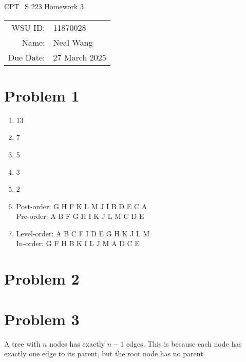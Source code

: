 \documentclass[12pt]{article}
\theoremstyle{definition}
\begin{document}
\begin{center}
  {\Large CPT\_S 223 Homework 3}
  $ $\\
  $ $\\
  \begin{tabular}{rl}
    WSU ID: & 11870028 \\
    Name: & Neal Wang \\
    Due Date: & 27 March 2025
  \end{tabular}
\end{center}

\section{Problem 1}

\begin{enumerate}[label=(\alph*)]
  \item 13
  \item 7
  \item 5
  \item 3
  \item 2
  \item Post-order: G H F K L M J I B D E C A \\
    Pre-order: A B F G H I K J L M C D E
  \item Level-order: A B C F I D E G H K J L M \\
    In-order: G F H B K I L J M A D C E
\end{enumerate}

\section{Problem 2}


\section{Problem 3}

A tree with $n$ nodes has exactly $n - 1$ edges. This is because each
node has exactly one edge to its parent, but the root node has no parent.
\end{document}
